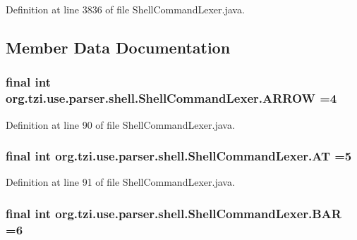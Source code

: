 Definition at line 3836 of file Shell\-Command\-Lexer.\-java.



\subsection{Member Data Documentation}
\hypertarget{classorg_1_1tzi_1_1use_1_1parser_1_1shell_1_1_shell_command_lexer_a590a083ca84dca482b87f4b67e65835d}{
\subsubsection[{A\-R\-R\-O\-W}]{\setlength{\rightskip}{0pt plus 5cm}final int org.\-tzi.\-use.\-parser.\-shell.\-Shell\-Command\-Lexer.\-A\-R\-R\-O\-W =4\hspace{0.3cm}{\ttfamily [static]}}}\label{classorg_1_1tzi_1_1use_1_1parser_1_1shell_1_1_shell_command_lexer_a590a083ca84dca482b87f4b67e65835d}


Definition at line 90 of file Shell\-Command\-Lexer.\-java.

\hypertarget{classorg_1_1tzi_1_1use_1_1parser_1_1shell_1_1_shell_command_lexer_a4a9d34eafb590c6203cdc289d628ccc7}{
\subsubsection[{A\-T}]{\setlength{\rightskip}{0pt plus 5cm}final int org.\-tzi.\-use.\-parser.\-shell.\-Shell\-Command\-Lexer.\-A\-T =5\hspace{0.3cm}{\ttfamily [static]}}}\label{classorg_1_1tzi_1_1use_1_1parser_1_1shell_1_1_shell_command_lexer_a4a9d34eafb590c6203cdc289d628ccc7}


Definition at line 91 of file Shell\-Command\-Lexer.\-java.

\hypertarget{classorg_1_1tzi_1_1use_1_1parser_1_1shell_1_1_shell_command_lexer_a85652412076c35acb0bb67cacf0cd85f}{
\subsubsection[{B\-A\-R}]{\setlength{\rightskip}{0pt plus 5cm}final int org.\-tzi.\-use.\-parser.\-shell.\-Shell\-Command\-Lexer.\-B\-A\-R =6\hspace{0.3cm}{\ttfamily [static]}}}\label{classorg_1_1tzi_1_1use_1_1parser_1_1shell_1_1_shell_command_lexer_a85652412076c35acb0bb67cacf0cd85f}


